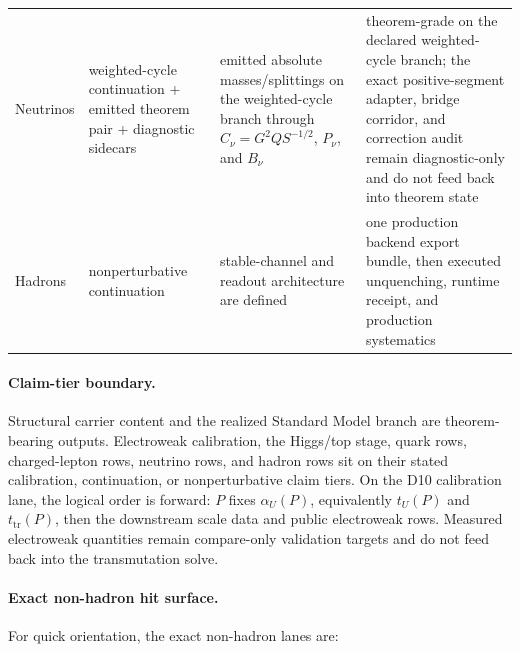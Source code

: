 \begin{longtable}{@{}>{\raggedright\arraybackslash}p{}>{\raggedright\arraybackslash}p{}>{\raggedright\arraybackslash}p{}>{\raggedright\arraybackslash}p{}@{}}
Neutrinos & weighted-cycle continuation + emitted theorem pair + diagnostic sidecars & emitted absolute masses/splittings on the weighted-cycle branch through \(C_\nu=G^2Q S^{-1/2}\), \(P_\nu\), and \(B_\nu\) & theorem-grade on the declared weighted-cycle branch; the exact positive-segment adapter, bridge corridor, and correction audit remain diagnostic-only and do not feed back into theorem state \\
Hadrons & nonperturbative continuation & stable-channel and readout architecture are defined & one production backend export bundle, then executed unquenching, runtime receipt, and production systematics \\
\end{longtable}
\normalsize

\paragraph{Claim-tier boundary.}
Structural carrier content and the realized Standard Model branch are theorem-bearing outputs.
Electroweak calibration, the Higgs/top stage, quark rows, charged-lepton rows, neutrino rows, and
hadron rows sit on their stated calibration, continuation, or nonperturbative claim tiers.
On the D10 calibration lane, the logical order is forward: \(P\) fixes \(\alpha_U(P)\),
equivalently \(t_U(P)\) and \(t_{\mathrm{tr}}(P)\), then the downstream scale data and public
electroweak rows. Measured electroweak quantities remain compare-only validation targets and do
not feed back into the transmutation solve.

\paragraph{Exact non-hadron hit surface.}
For quick orientation, the exact non-hadron lanes are:

